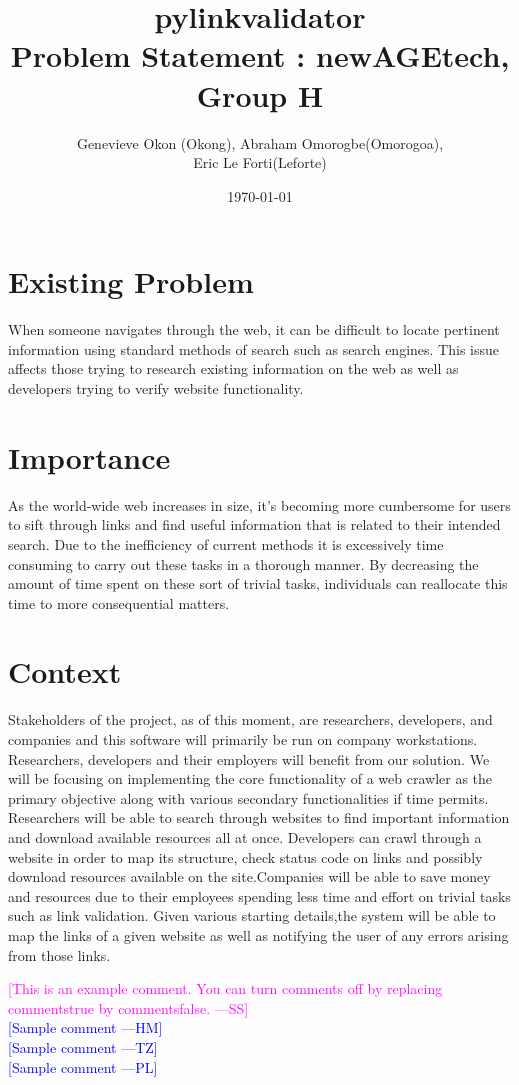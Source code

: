 \documentclass[12pt]{article}
\newcommand{\authornote}[3]{\textcolor{#1}{[#3 ---#2]}}
\newcommand{\authornote}[3]{}
\newcommand{\wss}[1]{\authornote{magenta}{SS}{#1}}
\newcommand{\hm}[1]{\authornote{blue}{HM}{#1}} %
\newcommand{\tz}[1]{\authornote{blue}{TZ}{#1}} %
\newcommand{\pl}[1]{\authornote{blue}{PL}{#1}} %
\begin{document}
\title{pylinkvalidator \\
 Problem Statement : newAGEtech, Group H }
\author{Genevieve Okon (Okong), Abraham Omorogbe(Omorogoa),\\
 Eric Le Forti(Leforte)}
\date{\today}
\maketitle

	
\section{Existing Problem}

When someone navigates through the web, it can be difficult to locate pertinent information using standard methods of search such as search engines. This issue affects those trying to research existing information on the web as well as developers trying to verify website functionality.\newline

\section{Importance}

As the world-wide web increases in size, it's becoming more cumbersome for users to sift through links and find useful information that is related to their intended search. Due to the inefficiency of current methods it is excessively time consuming to carry out these tasks in a thorough manner. By decreasing the amount of time spent on these sort of trivial tasks, individuals can reallocate this time to more consequential matters. \newline

\section{Context}

Stakeholders of the project, as of this moment, are researchers, developers, and companies and this software will primarily be run on company workstations.\\

Researchers, developers and their employers will benefit from our solution. We will be focusing on implementing the core functionality of a web crawler as the primary objective along with various secondary functionalities if time permits. Researchers will be able to search through websites to find important information and download available resources all at once. Developers can crawl through a website in order to map its structure, check status code on links and possibly download resources available on the site.Companies will be able to save money and resources due to their employees spending less time and effort on trivial tasks such as link validation. Given various starting details,the system will be able to map the links of a given website as well as notifying the user of any errors arising from those links.\newline



\noindent \wss{This is an example comment.  You can turn comments off by replacing
  commentstrue by commentsfalse.}\\
\hm{Sample comment}\\
\tz{Sample comment}\\
\pl{Sample comment}
\end{document}
